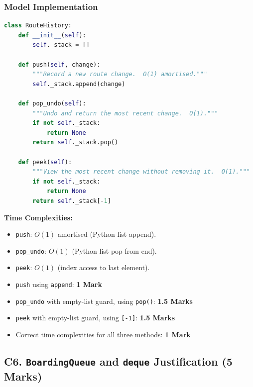 \documentclass[11pt,a4paper]{article}
\newenvironment{markbox}[1]{%
    \begin{tcolorbox}[colback=markgreen!6!white, colframe=markgreen, title=\textbf{Mark Allocation --- #1}]
}{%
    \end{tcolorbox}
}
\begin{document}
\subsubsection*{Model Implementation}
\begin{lstlisting}[language=Python]
class RouteHistory:
    def __init__(self):
        self._stack = []

    def push(self, change):
        """Record a new route change.  O(1) amortised."""
        self._stack.append(change)

    def pop_undo(self):
        """Undo and return the most recent change.  O(1)."""
        if not self._stack:
            return None
        return self._stack.pop()

    def peek(self):
        """View the most recent change without removing it.  O(1)."""
        if not self._stack:
            return None
        return self._stack[-1]
\end{lstlisting}

\textbf{Time Complexities:}
\begin{itemize}
    \item \texttt{push}: $O(1)$ amortised (Python list append).
    \item \texttt{pop\_undo}: $O(1)$ (Python list pop from end).
    \item \texttt{peek}: $O(1)$ (index access to last element).
\end{itemize}

\begin{markbox}{C5 --- 5 Marks}
\begin{itemize}
    \item \texttt{push} using \texttt{append}: \textbf{1 Mark}
    \item \texttt{pop\_undo} with empty-list guard, using \texttt{pop()}: \textbf{1.5 Marks}
    \item \texttt{peek} with empty-list guard, using \texttt{[-1]}: \textbf{1.5 Marks}
    \item Correct time complexities for all three methods: \textbf{1 Mark}
\end{itemize}
\end{markbox}

\subsection*{C6. \texttt{BoardingQueue} and \texttt{deque} Justification (5 Marks)}
\end{document}
